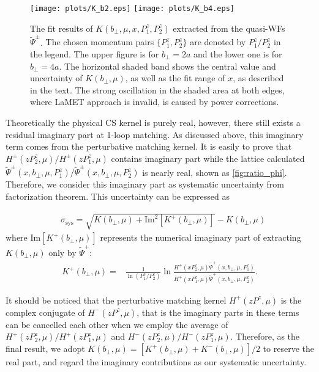 \documentclass[prd,aps,twocolumn,preprintnumbers, showpacs, nofootinbib,superscriptaddress,notitlepage]{revtex4-1}
\newcommand{\red}[1]{\textcolor{red}{#1}} %
\newcommand\bl{\color{blue}}
\begin{document}

\begin{figure}
\centering
\texttt{[image: plots/K\_b2.eps]}
\texttt{[image: plots/K\_b4.eps]}
\caption{The fit results of $K(b_{\perp},\mu,x,P^z_1,P^z_2)$ extracted {\bl from the} quasi-WFs $\tilde{\Psi}^{\pm}$. {\bl The chosen momentum pairs $\{P_1^z,P^z_2\}$ are denoted by $P^z_1/P_2^z$ in the legend}. The upper figure is for $b_{\perp}=2a$ and the lower one is for $b_{\perp}=4a$. The horizontal shaded band {\bl shows} the central value and uncertainty of $K(b_{\perp},\mu)$, as well as the fit range of $x$, as described in the text. The strong oscillation in the shaded area {\bl at both edges, where LaMET approach is invalid, is caused by power corrections.}}
    \label{fig:K_b}
\end{figure}

Theoretically the physical CS kernel is purely real, however, there still exists a residual imaginary part at 1-loop matching. As discussed above, this imaginary term comes from the perturbative matching kernel. It is easily to prove that $H^{\pm}(zP_2^z,\mu)/H^{\pm}(zP_1^z,\mu)$ contains imaginary part while the lattice calculated $\tilde{\Psi}^{\pm}(x,b_{\perp},\mu,P_1^z)/\tilde{\Psi}^{\pm}(x,b_{\perp},\mu,P_2^z)$ is nearly real, shown as \ref{fig:ratio_phi}. Therefore, we consider this imaginary part as systematic uncertainty from factorization theorem. This uncertainty can be expressed as

\begin{align}
&\sigma_{\mathrm{sys}}=\sqrt{K(b_{\perp},\mu)+\text{Im}^2\left[K^+(b_{\perp},\mu)\right]}-K(b_{\perp},\mu)
\label{eq:systematical_error}
\end{align}
where $\text{Im}\left[K^+(b_{\perp},\mu)\right]$ represents the numerical imaginary part of extracting $K(b_{\perp},\mu)$ only by $\tilde{\Psi}^+$:
\begin{align}
K^+(b_{\perp},\mu)=&\frac{1}{\ln (P^z_1/P^z_2)}\ln\frac{H^+(xP^z_2,\mu)\tilde \Psi^+(x, b_\perp, \mu, P^z_1)}{H^+(xP^z_1,\mu)\tilde \Psi^+(x, b_\perp, \mu, P^z_2)}.
\label{eq:K+}
\end{align}

It should be noticed that the perturbative matching kernel $H^+(zP^z,\mu)$ is the complex conjugate of $H^-(zP^z,\mu)$, that is the imaginary parts in these terms can be cancelled each other when we employ the average of $H^+(zP_2^z,\mu)/H^+(zP_1^z,\mu)$ and $H^-(zP_2^z,\mu)/H^-(zP_1^z,\mu)$. Therefore, as the final result, we adopt $K(b_{\perp},\mu)=\left[K^+(b_{\perp},\mu)+K^-(b_{\perp},\mu)\right]/2$ to reserve the real part, and regard the imaginary contributions as our systematic uncertainty.
\end{document}
